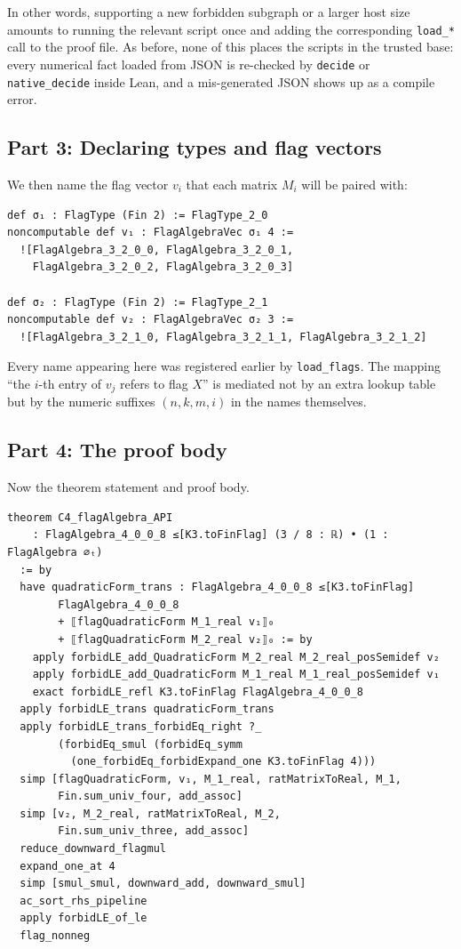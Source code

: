 \documentclass[11pt]{article}
\begin{document}
In other words, supporting a new forbidden subgraph or a larger host size
amounts to running the relevant script once and adding the corresponding
\texttt{load\_*} call to the proof file. As before, none of this places
the scripts in the trusted base: every numerical fact loaded from JSON is
re-checked by \texttt{decide} or \texttt{native\_decide} inside Lean, and a
mis-generated JSON shows up as a compile error.

\subsection{Part 3: Declaring types and flag vectors}

We then name the flag vector $v_i$ that each matrix $M_i$ will be paired
with:

\begin{lstlisting}
def σ₁ : FlagType (Fin 2) := FlagType_2_0
noncomputable def v₁ : FlagAlgebraVec σ₁ 4 :=
  ![FlagAlgebra_3_2_0_0, FlagAlgebra_3_2_0_1,
    FlagAlgebra_3_2_0_2, FlagAlgebra_3_2_0_3]

def σ₂ : FlagType (Fin 2) := FlagType_2_1
noncomputable def v₂ : FlagAlgebraVec σ₂ 3 :=
  ![FlagAlgebra_3_2_1_0, FlagAlgebra_3_2_1_1, FlagAlgebra_3_2_1_2]
\end{lstlisting}

Every name appearing here was registered earlier by \texttt{load\_flags}.
The mapping ``the $i$-th entry of $v_j$ refers to flag $X$'' is mediated
not by an extra lookup table but by the numeric suffixes $(n,k,m,i)$ in
the names themselves.

\subsection{Part 4: The proof body}

Now the theorem statement and proof body.

\begin{lstlisting}
theorem C4_flagAlgebra_API
    : FlagAlgebra_4_0_0_8 ≤[K3.toFinFlag] (3 / 8 : ℝ) • (1 : FlagAlgebra ∅ₜ)
  := by
  have quadraticForm_trans : FlagAlgebra_4_0_0_8 ≤[K3.toFinFlag]
        FlagAlgebra_4_0_0_8
        + ⟦flagQuadraticForm M_1_real v₁⟧₀
        + ⟦flagQuadraticForm M_2_real v₂⟧₀ := by
    apply forbidLE_add_QuadraticForm M_2_real M_2_real_posSemidef v₂
    apply forbidLE_add_QuadraticForm M_1_real M_1_real_posSemidef v₁
    exact forbidLE_refl K3.toFinFlag FlagAlgebra_4_0_0_8
  apply forbidLE_trans quadraticForm_trans
  apply forbidLE_trans_forbidEq_right ?_
        (forbidEq_smul (forbidEq_symm
          (one_forbidEq_forbidExpand_one K3.toFinFlag 4)))
  simp [flagQuadraticForm, v₁, M_1_real, ratMatrixToReal, M_1,
        Fin.sum_univ_four, add_assoc]
  simp [v₂, M_2_real, ratMatrixToReal, M_2,
        Fin.sum_univ_three, add_assoc]
  reduce_downward_flagmul
  expand_one_at 4
  simp [smul_smul, downward_add, downward_smul]
  ac_sort_rhs_pipeline
  apply forbidLE_of_le
  flag_nonneg
\end{lstlisting}
\end{document}
